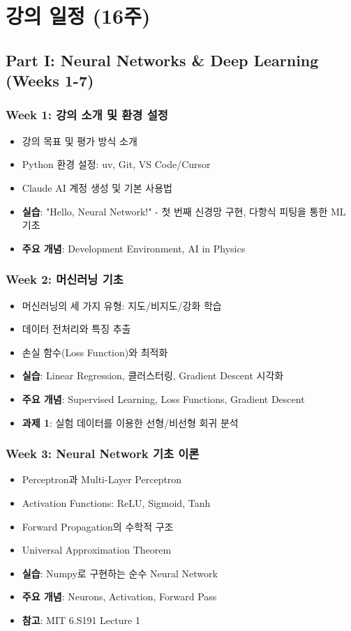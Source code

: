 \documentclass[11pt,a4paper]{article}
\begin{document}
\newpage

\section{강의 일정 (16주)}

\subsection{Part I: Neural Networks \& Deep Learning (Weeks 1-7)}

\subsubsection*{Week 1: 강의 소개 및 환경 설정}
\begin{itemize}[noitemsep]
    \item 강의 목표 및 평가 방식 소개
    \item Python 환경 설정: uv, Git, VS Code/Cursor
    \item Claude AI 계정 생성 및 기본 사용법
    \item \textbf{실습}: "Hello, Neural Network!" - 첫 번째 신경망 구현, 다항식 피팅을 통한 ML 기초
    \item \textbf{주요 개념}: Development Environment, AI in Physics
\end{itemize}

\subsubsection*{Week 2: 머신러닝 기초}
\begin{itemize}[noitemsep]
    \item 머신러닝의 세 가지 유형: 지도/비지도/강화 학습
    \item 데이터 전처리와 특징 추출
    \item 손실 함수(Loss Function)와 최적화
    \item \textbf{실습}: Linear Regression, 클러스터링, Gradient Descent 시각화
    \item \textbf{주요 개념}: Supervised Learning, Loss Functions, Gradient Descent
    \item \textbf{과제 1}: 실험 데이터를 이용한 선형/비선형 회귀 분석
\end{itemize}

\subsubsection*{Week 3: Neural Network 기초 이론}
\begin{itemize}[noitemsep]
    \item Perceptron과 Multi-Layer Perceptron
    \item Activation Functions: ReLU, Sigmoid, Tanh
    \item Forward Propagation의 수학적 구조
    \item Universal Approximation Theorem
    \item \textbf{실습}: Numpy로 구현하는 순수 Neural Network
    \item \textbf{주요 개념}: Neurons, Activation, Forward Pass
    \item \textbf{참고}: MIT 6.S191 Lecture 1
\end{itemize}
\end{document}
